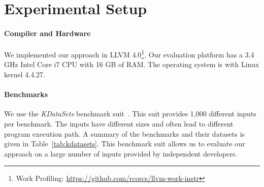 \section{Experimental Setup}
\paragraph{Compiler and Hardware} We implemented our approach in LLVM 4.0\footnote{Work Profiling: \url{https://github.com/rcorcs/llvm-work-instr}}. Our evaluation platform has a  3.4 GHz Intel Core i7 CPU with 16 GB of RAM. The
operating system is  with Linux kernel 4.4.27.


\paragraph{Benchmarks}
We use the \textit{KDataSets} benchmark suit~\cite{chen10,chen12a}. This suit provides 1,000 different inputs per benchmark. The inputs
have different sizes and often lead to different program execution path. A summary of the benchmarks and their datasets is given in
Table~\ref{tab:kdatasets}. This benchmark suit allows us to evaluate our approach on a large number of inputs provided by independent
developers.

\begin{table*}[t]
\centering
\scriptsize
{}
\caption{Training benchmarks and their inputs}
\label{tab:kdatasets:training}
\end{table*}

